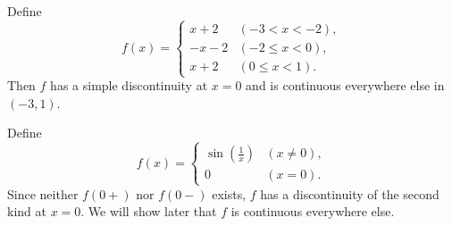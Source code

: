 \documentclass{article}
\begin{document}
\begin{example}
    Define 
    \[f(x)=\begin{cases}
        x+2 & (-3<x<-2),\\
        -x-2 & (-2\leq x<0),\\
        x+2 & (0\leq x<1).
    \end{cases}\]Then $f$ has a simple discontinuity at $x=0$ and is continuous everywhere else in $(-3,1).$
\end{example}
\begin{example}
    Define
    \[f(x)=\begin{cases}
            \sin(\frac{1}{x}) & (x\neq 0),\\
            0 & (x=0).
        \end{cases}\]
    Since neither $f(0+)$ nor $f(0-)$ exists, $f$ has a discontinuity of the second kind at $x=0$. We will show later that $f$ is continuous everywhere else.
\end{example}
\end{document}
